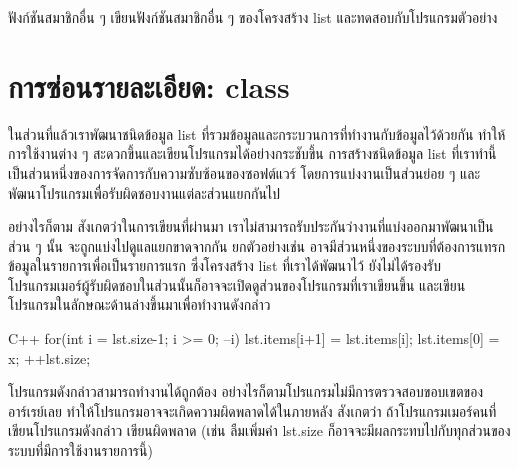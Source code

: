 \begin{quiz}{ฟังก์ชัน{\wbr}สมาชิก{\wbr}อื่น ๆ}
เขียน{\wbr}ฟังก์ชัน{\wbr}สมาชิก{\wbr}อื่น ๆ ของ{\wbr}โครงสร้าง {\ct list} และ{\wbr}ทดสอบ{\wbr}กับ{\wbr}โปรแกรม{\wbr}ตัวอย่าง{\wbr}
\end{quiz}

\section{การ{\wbr}ซ่อน{\wbr}รายละเอียด: {\ct class}}

ใน{\wbr}ส่วน{\wbr}ที่แล้ว{\wbr}เรา{\wbr}พัฒนา{\wbr}ชนิด{\wbr}ข้อมูล {\ct list}
ที่{\wbr}รวม{\wbr}ข้อมูล{\wbr}และ{\wbr}กระบวนการ{\wbr}ที่ทำงาน{\wbr}กับ{\wbr}ข้อมูล{\wbr}ไว้{\wbr}ด้วย{\wbr}กัน ทำ{\wbr}ให้การ{\wbr}ใช้{\wbr}งาน{\wbr}ต่าง ๆ
สะดวก{\wbr}ขึ้น{\wbr}และ{\wbr}เขียน{\wbr}โปรแกรม{\wbr}ได้{\wbr}อย่าง{\wbr}กระชับ{\wbr}ขึ้น การ{\wbr}สร้าง{\wbr}ชนิด{\wbr}ข้อมูล {\ct list} ที่{\wbr}เรา{\wbr}ทำ{\wbr}นี้{\wbr}
เป็น{\wbr}ส่วนหนึ่ง{\wbr}ของ{\wbr}การ{\wbr}จัดการ{\wbr}กับ{\wbr}ความ{\wbr}ซับซ้อน{\wbr}ของ{\wbr}ซอฟต์แวร์ โดย{\wbr}การ{\wbr}แบ่ง{\wbr}งาน{\wbr}เป็น{\wbr}ส่วนย่อย ๆ
และ{\wbr}พัฒนา{\wbr}โปรแกรม{\wbr}เพื่อ{\wbr}รับผิดชอบ{\wbr}งาน{\wbr}แต่ละ{\wbr}ส่วน{\wbr}แยกกัน{\wbr}ไป{\wbr}

อย่างไรก็ตาม สังเกต{\wbr}ว่า{\wbr}ใน{\wbr}การ{\wbr}เขียน{\wbr}ที่{\wbr}ผ่าน{\wbr}มา{\wbr}
เรา{\wbr}ไม่{\wbr}สามารถ{\wbr}รับประกัน{\wbr}ว่า{\wbr}งาน{\wbr}ที่{\wbr}แบ่ง{\wbr}ออก{\wbr}มา{\wbr}พัฒนา{\wbr}เป็น{\wbr}ส่วน ๆ นั้น{\wbr}
จะ{\wbr}ถูก{\wbr}แบ่ง{\wbr}ไป{\wbr}ดูแล{\wbr}แยก{\wbr}ขาด{\wbr}จาก{\wbr}กัน ยก{\wbr}ตัวอย่าง{\wbr}เช่น{\wbr}
อาจ{\wbr}มี{\wbr}ส่วนหนึ่ง{\wbr}ของ{\wbr}ระบบ{\wbr}ที่{\wbr}ต้องการ{\wbr}แทรก{\wbr}ข้อมูล{\wbr}ใน{\wbr}รายการ{\wbr}เพื่อ{\wbr}เป็น{\wbr}รายการ{\wbr}แรก ซึ่ง{\wbr}โครงสร้าง{\wbr}
{\ct list} ที่{\wbr}เรา{\wbr}ได้{\wbr}พัฒนา{\wbr}ไว้ ยัง{\wbr}ไม่{\wbr}ได้{\wbr}รองรับ{\wbr}
โปรแกรมเมอร์{\wbr}ผู้รับผิดชอบ{\wbr}ใน{\wbr}ส่วน{\wbr}นั้น{\wbr}ก็{\wbr}อาจ{\wbr}จะ{\wbr}เปิด{\wbr}ดู{\wbr}ส่วน{\wbr}ของ{\wbr}โปรแกรม{\wbr}ที่{\wbr}เรา{\wbr}เขียน{\wbr}ขึ้น{\wbr}
และ{\wbr}เขียน{\wbr}โปรแกรม{\wbr}ใน{\wbr}ลักษณะ{\wbr}ด้าน{\wbr}ล่าง{\wbr}ขึ้น{\wbr}มา{\wbr}เพื่อ{\wbr}ทำงาน{\wbr}ดังกล่าว{\wbr}

\latintext
\begin{codelist}{C++}{}
for(int i = lst.size-1; i >= 0; --i)
  lst.items[i+1] = lst.items[i];
lst.items[0] = x;
++lst.size;
\end{codelist}
\thaitext

โปรแกรม{\wbr}ดังกล่าว{\wbr}สามารถ{\wbr}ทำงาน{\wbr}ได้{\wbr}ถูกต้อง{\wbr}
อย่างไรก็ตาม{\wbr}โปรแกรม{\wbr}ไม่{\wbr}มี{\wbr}การ{\wbr}ตรวจสอบ{\wbr}ขอบเขต{\wbr}ของ{\wbr}อาร์เรย์{\wbr}เลย{\wbr}
ทำ{\wbr}ให้{\wbr}โปรแกรม{\wbr}อาจ{\wbr}จะ{\wbr}เกิด{\wbr}ความผิด{\wbr}พลาด{\wbr}ได้{\wbr}ใน{\wbr}ภายหลัง สังเกต{\wbr}ว่า{\wbr}
ถ้า{\wbr}โปรแกรมเมอร์{\wbr}คน{\wbr}ที่{\wbr}เขียน{\wbr}โปรแกรม{\wbr}ดังกล่าว เขียน{\wbr}ผิดพลาด (เช่น ลืม{\wbr}เพิ่ม{\wbr}ค่า {\ct
  lst.size} ก็{\wbr}อาจ{\wbr}จะ{\wbr}มี{\wbr}ผลกระทบ{\wbr}ไป{\wbr}กับ{\wbr}ทุก{\wbr}ส่วน{\wbr}ของ{\wbr}ระบบ{\wbr}ที่{\wbr}มี{\wbr}การ{\wbr}ใช้{\wbr}งาน{\wbr}รายการ{\wbr}นี้)

